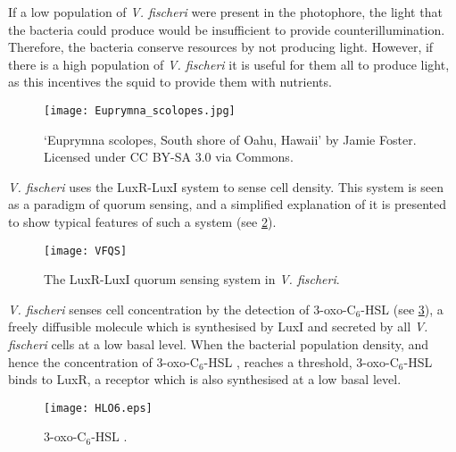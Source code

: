 If a low population of \textit{V. fischeri} were present in the photophore, the  light that the bacteria could produce would be insufficient to provide counterillumination. Therefore, the bacteria conserve resources by not producing light.
However, if there is a high population of \textit{V. fischeri} it is useful for them all to produce light, as this incentives the squid to provide them with nutrients. 


\begin{figure}[H]
	\begin{center}
		\texttt{[image: Euprymna\_scolopes.jpg]} 	
		\caption{`Euprymna scolopes, South shore of Oahu, Hawaii' by Jamie Foster. Licensed under CC BY-SA 3.0 via Commons.
		\label{fgr:ES}}
	\end{center}
\end{figure}


\textit{V. fischeri} uses the LuxR-LuxI system to sense cell density. This system is seen as a paradigm of quorum sensing, and a simplified explanation of it is presented to show typical features of such a system (see \ref{fgr:VFQS}).

\begin{figure}[H]
	\begin{center}
		\texttt{[image: VFQS]}
		\caption{The LuxR-LuxI quorum sensing system in \textit{V. fischeri}. \label{fgr:VFQS}}
	\end{center}
\end{figure}


\textit{V. fischeri} senses cell concentration by the detection of 3-oxo-C$_6$-HSL \cite{Eberhard1981} (see \ref{fgr:HLO6}), a freely diffusible\cite{Kaplan1985} molecule which is synthesised by LuxI\cite{Parsek1999, Watson2002} and secreted by all \textit{V. fischeri} cells\cite{Schaefer1996} at a low basal level\cite{Miller2001}. 
When the bacterial population density, and hence the concentration of 3-oxo-C$_6$-HSL , reaches a threshold, 3-oxo-C$_6$-HSL  binds to LuxR\cite{Hanzelka1995,Choi1991,Choi1992}, a receptor which is also synthesised at a low basal level. 

\begin{figure}[H]
	\begin{center}
		\texttt{[image: HLO6.eps]}
		\caption{3-oxo-C$_6$-HSL . \label{fgr:HLO6}}
	\end{center}
\end{figure}

